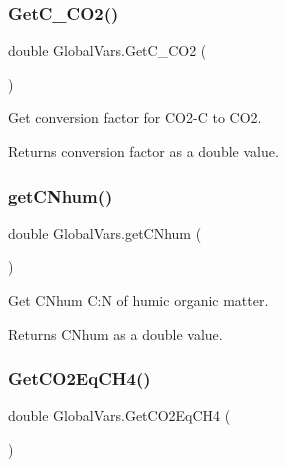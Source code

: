 \subsubsection{\texorpdfstring{GetC\_CO2()}{GetC\_CO2()}}
{\footnotesize\ttfamily double Global\+Vars.\+Get\+C\+\_\+\+C\+O2 (\begin{DoxyParamCaption}{ }\end{DoxyParamCaption})\hspace{0.3cm}{\ttfamily [inline]}}



Get conversion factor for C\+O2-\/C to C\+O2. 

\begin{DoxyReturn}{Returns}
conversion factor as a double value. 
\end{DoxyReturn}
\mbox{\label{class_global_vars_ae3c99a4d8f250b66225cc04944f5cbf9}} 
\subsubsection{\texorpdfstring{getCNhum()}{getCNhum()}}
{\footnotesize\ttfamily double Global\+Vars.\+get\+C\+Nhum (\begin{DoxyParamCaption}{ }\end{DoxyParamCaption})\hspace{0.3cm}{\ttfamily [inline]}}



Get C\+Nhum C\+:N of humic organic matter. 

\begin{DoxyReturn}{Returns}
C\+Nhum as a double value. 
\end{DoxyReturn}
\mbox{\label{class_global_vars_ac7ae0cf95fa3e649fac5769867ec1de0}} 
\subsubsection{\texorpdfstring{GetCO2EqCH4()}{GetCO2EqCH4()}}
{\footnotesize\ttfamily double Global\+Vars.\+Get\+C\+O2\+Eq\+C\+H4 (\begin{DoxyParamCaption}{ }\end{DoxyParamCaption})\hspace{0.3cm}{\ttfamily [inline]}}



